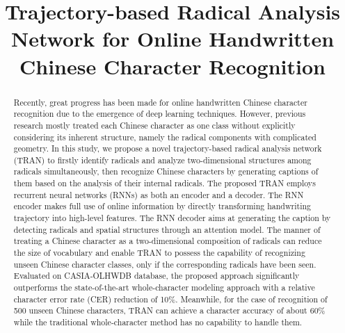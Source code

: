 \documentclass[a4paper,conference]{IEEEtran}
\begin{document}
\title{Trajectory-based Radical Analysis Network for Online Handwritten Chinese Character Recognition}


\author{
}



\maketitle

\begin{abstract}
  Recently, great progress has been made for online handwritten Chinese character recognition due to the emergence of deep learning techniques. However, previous research mostly treated each Chinese character as one class without explicitly considering its inherent structure, namely the radical components with complicated geometry. In this study, we propose a novel trajectory-based radical analysis network (TRAN) to firstly identify radicals and analyze two-dimensional structures among radicals simultaneously, then recognize Chinese characters by generating captions of them based on the analysis of their internal radicals. The proposed TRAN employs recurrent neural networks (RNNs) as both an encoder and a decoder. The RNN encoder makes full use of online information by directly transforming handwriting trajectory into high-level features. The RNN decoder aims at generating the caption by detecting radicals and spatial structures through an attention model. The manner of treating a Chinese character as a two-dimensional composition of radicals can reduce the size of vocabulary and enable TRAN to possess the capability of recognizing unseen Chinese character classes, only if the corresponding radicals have been seen. Evaluated on CASIA-OLHWDB database, the proposed approach significantly outperforms the state-of-the-art whole-character modeling approach with a relative character error rate (CER) reduction of 10\%. Meanwhile, for the case of recognition of 500 unseen Chinese characters, TRAN can achieve a character accuracy of about 60\% while the traditional whole-character method has no capability to handle them.
\end{abstract}
\end{document}
